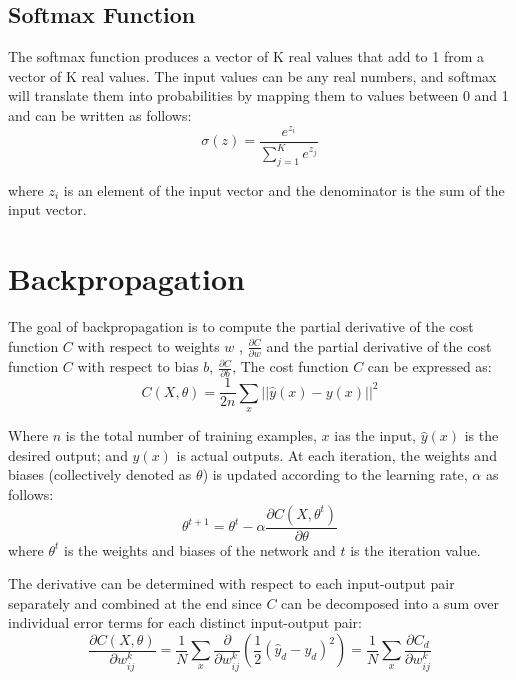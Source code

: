\subsection{Softmax Function}

The softmax function produces a vector of K real values that add to 1 from a vector of K real values. The input values can be any real numbers, and softmax will translate them into probabilities by mapping them to values between 0 and 1 and can be written as follows:
\begin{equation}
    \sigma(z) = \frac{e^{z_i}}{\sum_{j=1}^K e^{z_j}}
\end{equation}

where $z_i$ is an element of the input vector and the denominator is the sum of the input vector.

\section{Backpropagation}

The goal of backpropagation is to compute the partial derivative of the cost function $C$ with respect to weights $w$ , $\frac{\partial C}{\partial w}$ and   the partial derivative of the cost function $C$ with respect to bias $b$, $\frac{\partial C}{\partial b}$, The cost function $C$ can be expressed as:
\begin{equation}
    C(X,\theta) = \frac{1}{2n} \sum_x ||\hat{y}(x) - y(x)||^2 
\end{equation}

Where $n$ is the total number of training examples, $x$ ias the input, $\hat{y}(x)$ is the desired output; and $y(x)$ is actual outputs. At each iteration, the weights and biases (collectively denoted as $\theta$) is updated according to the learning rate, $\alpha$ as follows:
\begin{equation}
    \theta^{t+1} = \theta^t - \alpha \frac{\partial C(X,\theta^t)}{\partial \theta}
\end{equation}
where $\theta^t$ is the weights and biases of the network and $t$ is the iteration value.

The derivative can be determined with respect to each input-output pair separately and combined at the end since $C$ can be decomposed into a sum over individual error terms for each distinct input-output pair:
\begin{equation}
    \frac{\partial C(X,\theta)}{\partial w_{ij}^k} = \frac{1}{N} \sum_x \frac{\partial}{\partial w_{ij}^k}(\frac{1}{2}(\hat{y}_d-y_d)^2) = \frac{1}{N} \sum_x \frac{\partial C_d}{\partial w_{ij}^k}
\end{equation}

